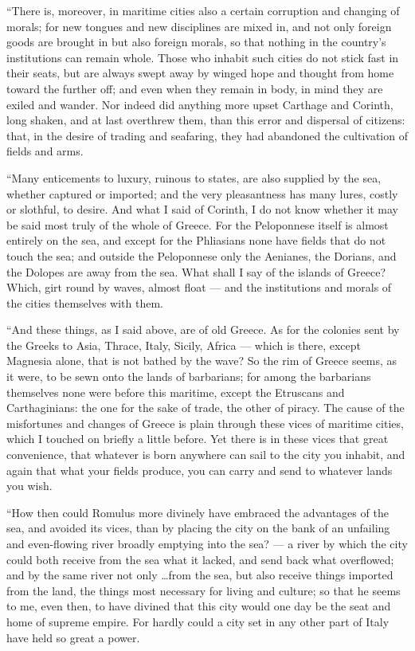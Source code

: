  ``There is, moreover, in maritime cities also a certain corruption and changing of morals; for new tongues and new disciplines are mixed in, and not only foreign goods are brought in but also foreign morals, so that nothing in the country's institutions can remain whole. Those who inhabit such cities do not stick fast in their seats, but are always swept away by winged hope and thought from home toward the further off; and even when they remain in body, in mind they are exiled and wander. Nor indeed did anything more upset Carthage and Corinth, long shaken, and at last overthrew them, than this error and dispersal of citizens: that, in the desire of trading and seafaring, they had abandoned the cultivation of fields and arms.

 ``Many enticements to luxury, ruinous to states, are also supplied by the sea, whether captured or imported; and the very pleasantness has many lures, costly or slothful, to desire. And what I said of Corinth, I do not know whether it may be said most truly of the whole of Greece. For the Peloponnese itself is almost entirely on the sea, and except for the Phliasians none have fields that do not touch the sea; and outside the Peloponnese only the Aenianes, the Dorians, and the Dolopes are away from the sea. What shall I say of the islands of Greece? Which, girt round by waves, almost float --- and the institutions and morals of the cities themselves with them.

 ``And these things, as I said above, are of old Greece. As for the colonies sent by the Greeks to Asia, Thrace, Italy, Sicily, Africa --- which is there, except Magnesia alone, that is not bathed by the wave? So the rim of Greece seems, as it were, to be sewn onto the lands of barbarians; for among the barbarians themselves none were before this maritime, except the Etruscans and Carthaginians: the one for the sake of trade, the other of piracy. The cause of the misfortunes and changes of Greece is plain through these vices of maritime cities, which I touched on briefly a little before. Yet there is in these vices that great convenience, that whatever is born anywhere can sail to the city you inhabit, and again that what your fields produce, you can carry and send to whatever lands you wish.

 ``How then could Romulus more divinely have embraced the advantages of the sea, and avoided its vices, than by placing the city on the bank of an unfailing and even-flowing river broadly emptying into the sea? --- a river by which the city could both receive from the sea what it lacked, and send back what overflowed; and by the same river not only \ldots from the sea, but also receive things imported from the land, the things most necessary for living and culture; so that he seems to me, even then, to have divined that this city would one day be the seat and home of supreme empire. For hardly could a city set in any other part of Italy have held so great a power.

